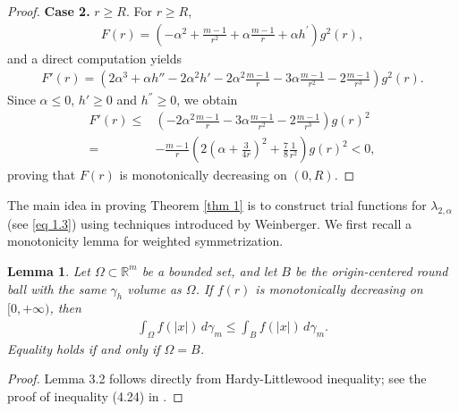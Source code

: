 \documentclass[11pt,leqno]{amsart}
\newtheorem{lemma}{Lemma}[section]
\def\a{\alpha}
\def\l{\lambda}
\def\R{\mathbb{R}}
\numberwithin{equation}{section}
\begin{document}
\begin{proof}
{\bf Case 2.} $r\ge R$. For $r\ge R$, 
\begin{align*}
    F(r)=(-\alpha^{2}+\frac{m-1}{r^{2}}+\alpha\frac{m-1}{r}+\alpha h^{'})g^{2}(r),
\end{align*}
and a direct computation yields
\begin{align*}
    F'(r)=(2\alpha^{3}+\alpha h''-2\alpha^{2}h'-2\alpha^{2}\frac{m-1}{r}-3\alpha \frac{m-1}{r^{2}}-2\frac{m-1}{r^{3}})g^{2}(r).
\end{align*}
Since   $\alpha\leq 0$, $h'\geq 0$ and $h^{''}\geq 0$, we obtain
\begin{align*}
    F'(r)\le&    \left(-2\alpha^{2}\frac{m-1}{r}-3\alpha \frac{m-1}{r^{2}}-2\frac{m-1}{r^{3}}\right) g(r)^2\\
    =&-\frac{m-1}{r}(2(\alpha+\frac{3}{4r})^{2}+\frac{7}{8}\frac{1}{r^{2}})g(r)^2<0,
\end{align*}
proving that $F(r)$ is monotonically decreasing on $(0, R)$.
\end{proof}
 The main idea in proving Theorem \ref{thm 1}  is to construct trial functions for $\l_{2, \a}$ (see \eqref{eq 1.3}) using techniques introduced by Weinberger. We first recall a monotonicity lemma for weighted symmetrization.
\begin{lemma}\label{Lemma 3.2}
    Let $\Omega\subset \R^m$ be a bounded set, and let $B$ be the origin-centered round ball with the same $\gamma_h$ volume as $\Omega$. If $f(r)$ is monotonically decreasing  on  $[0,+\infty)$, then 
    \begin{align*}
        \int_\Omega f(|x|)\, d\gamma_m\le    \int_B f(|x|)\, d\gamma_m.
    \end{align*}
    Equality holds if and only if $\Omega=B$.
\end{lemma}
\begin{proof}
  Lemma 3.2 follows directly from Hardy-Littlewood inequality;  see the proof of  inequality (4.24) in \cite[Page 213]{BCB16}.
\end{proof}
\end{document}
